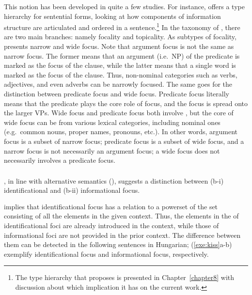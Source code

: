 This notion has been developed in quite a few studies. For instance,
\citet{paggio:09} offers a type hierarchy for sentential forms,
looking at how components of information structure are articulated and
ordered in a sentence.\footnote{The type hierarchy that
  \citeauthor{paggio:09} proposes is presented in
  Chapter~\ref{chapter8} with discussion about which implication it
  has on the current work.} In the taxonomy of \citet{paggio:09},
there are two main branches: namely focality and topicality.  As
subtypes of focality, \citeauthor{paggio:09} presents narrow  and
wide focus.
Note that argument focus is not the same as narrow
focus. The former means that an argument (i.e.\ NP) of the predicate
is marked as the focus of the clause, while the latter means that a
single word is marked as the focus of the clause. Thus, non-nominal
categories such as verbs, adjectives, and even adverbs can be narrowly
focused. The same goes for the distinction between predicate focus and
wide focus. Predicate focus literally means that the predicate plays
the core role of focus, and the focus is spread onto the larger VPs.
Wide focus and predicate focus both involve ,
but the core of wide focus can be from various lexical categories,
including nominal ones (e.g.\ common nouns, proper names, pronouns,
etc.). In other words, argument focus is a subset of narrow focus;
predicate focus is a subset of wide focus, and a narrow focus is not
necessarily an argument focus; a wide focus does not necessarily
involves a predicate focus.


\subsubsection{\citet{kiss:98}}
\label{3:sssec:kiss}

\citeauthor{kiss:98}, in line with alternative semantics
(\citealt{rooth:92}), suggests a distinction between (b-i)
identificational  and (b-ii) informational focus.


\noindent {} implies that identificational focus has a
relation to a powerset of the set consisting of all the elements in
the given context. Thus, the elements in the  of
identificational foci are already introduced in the context, while
those of informational foci are not provided in the prior context.
The difference between them can be detected in the following sentences
in Hungarian; (\ref{exe:kiss}a-b) exemplify identificational focus and
informational focus, respectively.


